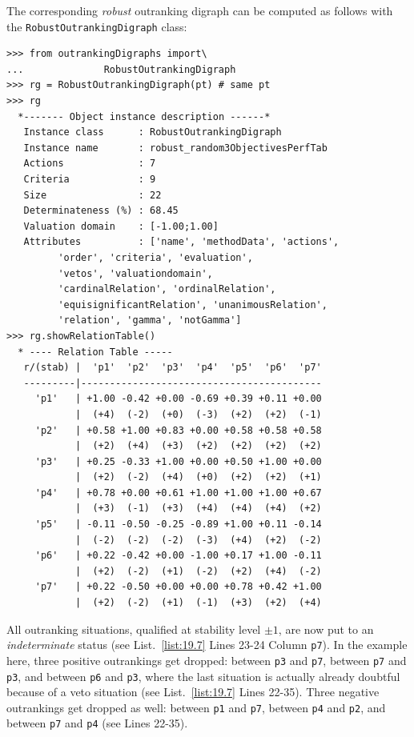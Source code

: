 The corresponding \emph{robust} outranking digraph can be computed as follows with the \texttt{RobustOutrankingDigraph} class:
\begin{lstlisting}[caption={Computing a robust outranking digraph},label=list:19.7]
>>> from outrankingDigraphs import\
...              RobustOutrankingDigraph
>>> rg = RobustOutrankingDigraph(pt) # same pt
>>> rg
  *------- Object instance description ------*
   Instance class      : RobustOutrankingDigraph
   Instance name       : robust_random3ObjectivesPerfTab
   Actions             : 7
   Criteria            : 9
   Size                : 22
   Determinateness (%) : 68.45
   Valuation domain    : [-1.00;1.00]
   Attributes          : ['name', 'methodData', 'actions',
         'order', 'criteria', 'evaluation',
         'vetos', 'valuationdomain',
         'cardinalRelation', 'ordinalRelation',
         'equisignificantRelation', 'unanimousRelation',
         'relation', 'gamma', 'notGamma']
>>> rg.showRelationTable()
  * ---- Relation Table -----
   r/(stab) |  'p1'  'p2'  'p3'  'p4'  'p5'  'p6'  'p7'   
   ---------|------------------------------------------
     'p1'   | +1.00 -0.42 +0.00 -0.69 +0.39 +0.11 +0.00  
            |  (+4)  (-2)  (+0)  (-3)  (+2)  (+2)  (-1)  
     'p2'   | +0.58 +1.00 +0.83 +0.00 +0.58 +0.58 +0.58  
            |  (+2)  (+4)  (+3)  (+2)  (+2)  (+2)  (+2)  
     'p3'   | +0.25 -0.33 +1.00 +0.00 +0.50 +1.00 +0.00  
            |  (+2)  (-2)  (+4)  (+0)  (+2)  (+2)  (+1)  
     'p4'   | +0.78 +0.00 +0.61 +1.00 +1.00 +1.00 +0.67  
            |  (+3)  (-1)  (+3)  (+4)  (+4)  (+4)  (+2)  
     'p5'   | -0.11 -0.50 -0.25 -0.89 +1.00 +0.11 -0.14  
            |  (-2)  (-2)  (-2)  (-3)  (+4)  (+2)  (-2)  
     'p6'   | +0.22 -0.42 +0.00 -1.00 +0.17 +1.00 -0.11  
            |  (+2)  (-2)  (+1)  (-2)  (+2)  (+4)  (-2)  
     'p7'   | +0.22 -0.50 +0.00 +0.00 +0.78 +0.42 +1.00  
            |  (+2)  (-2)  (+1)  (-1)  (+3)  (+2)  (+4)  
\end{lstlisting}

All outranking situations, qualified at stability level $\pm 1$, are now put to an \emph{indeterminate} status (see List.~\ref{list:19.7} Lines 23-24 Column \texttt{p7}). In the example here, three positive outrankings get dropped: between \texttt{p3} and \texttt{p7}, between \texttt{p7} and \texttt{p3}, and between \texttt{p6} and \texttt{p3}, where the last situation is actually already doubtful because of a veto situation (see List.~\vref{list:19.7} Lines 22-35). Three negative outrankings get dropped as well: between \texttt{p1} and \texttt{p7}, between \texttt{p4} and \texttt{p2}, and between \texttt{p7} and \texttt{p4} (see Lines 22-35).

